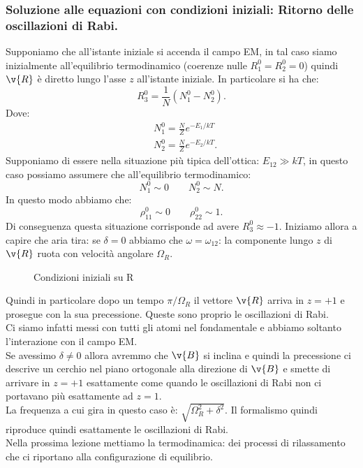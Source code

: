 \subsubsection{Soluzione alle equazioni con condizioni iniziali: Ritorno delle oscillazioni di Rabi.}%
Supponiamo che all'istante iniziale si accenda il campo EM, in tal caso siamo inizialmente all'equilibrio termodinamico (coerenze nulle $R_1^0 = R_2^0=0$) quindi $\v{R}$ è diretto lungo l'asse $z$ all'istante iniziale.
In particolare si ha che:
\[
    R_3^0 = \frac{1}{N}\left(N_1^0 -N_2^0\right)
.\] 
Dove:
\[\begin{aligned}
    &N_1^0 = \frac{N}{Z}e^{-E_1 /kT}\\
    &N_2^0 = \frac{N}{Z}e^{-E_2 /kT}
.\end{aligned}\]
Supponiamo di essere nella situazione più tipica dell'ottica: $E_{12}\gg kT$, in questo caso possiamo assumere che all'equilibrio termodinamico:
\[
N_1^0\sim 0\qquad
N_2^0 \sim N
.\] 
In questo modo abbiamo che:
\[
    \rho_{11}^0\sim 0\qquad
    \rho_{22}^0\sim 1
.\] 
Di conseguenza questa situazione corrisponde ad avere $R_3^0\approx-1$.
Iniziamo allora a capire che aria tira: se $\delta =0$ abbiamo che $\omega = \omega_{12}$: la componente lungo $z$ di $\v{R}$ ruota con velocità angolare $\Omega_R$. 
\begin{figure}[H]
    \centering
    \caption{Condizioni iniziali su R}
    \label{fig:condizioni-iniziali-su-r}
\end{figure}
\noindent
Quindi in particolare dopo un tempo $\pi /\Omega_R$  il vettore $\v{R}$ arriva in $z=+1$ e prosegue con la sua precessione. Queste sono proprio le oscillazioni di Rabi.\\
Ci siamo infatti messi con tutti gli atomi nel fondamentale e abbiamo soltanto l'interazione con il campo EM.\\
Se avessimo $\delta\neq 0$ allora avremmo che $\v{B}$ si inclina e quindi la precessione ci descrive un cerchio nel piano ortogonale alla direzione di $\v{B}$ e smette di arrivare in $z=+1$ esattamente come quando le oscillazioni di Rabi non ci portavano più esattamente ad $z=1$.\\
La frequenza a cui gira in questo caso è: $\sqrt{\Omega_R^2+\delta^2}$. Il formalismo quindi riproduce quindi esattamente le oscillazioni di Rabi.\\
Nella prossima lezione mettiamo la termodinamica: dei processi di rilassamento che ci riportano alla configurazione di equilibrio.

